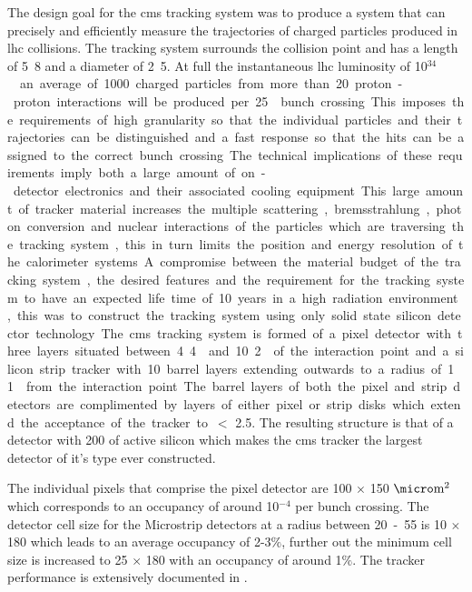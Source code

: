 The design goal for the \ac{cms} tracking system was to produce a system that 
can precisely and efficiently measure the trajectories of charged particles 
produced in \ac{lhc} collisions. The tracking system surrounds the collision 
point and has a length of \unit{5.8}{\meter} and a diameter of 
\unit{2.5}{\meter}. At full the instantaneous \ac{lhc} luminosity of 
\unit{10$^{34}$}{\lumiunits} an average of 1000 charged particles from more 
than 20 proton-proton interactions will be produced per \unit{25}{\nano\second} 
bunch crossing. This imposes the requirements of high granularity so that the 
individual particles and their trajectories can be distinguished and a fast 
response so that the hits can be assigned to the correct bunch crossing. The 
technical implications of these requirements imply both a large amount of 
on-detector electronics and their associated cooling equipment. This large 
amount of tracker material increases the multiple scattering, bremsstrahlung, 
photon conversion and nuclear interactions of the particles which are 
traversing the tracking system, this in turn limits the position and energy 
resolution of the calorimeter systems. A compromise between the material budget 
of the tracking system, the desired features and the requirement for the 
tracking system to have an expected life time of 10 years in a high radiation 
environment, this was to construct the tracking system using only solid state 
silicon detector technology.

The \ac{cms} tracking system is formed of a pixel detector with three layers 
situated between \unit{4.4}{\cm} and \unit{10.2}{\cm} of the interaction point 
and a silicon strip tracker with 10 barrel layers extending outwards to a 
radius of \unit{1.1}{\meter} from the interaction point. The barrel layers of 
both the pixel and strip detectors are complimented by layers of either pixel 
or strip disks which extend the acceptance of the tracker to \mETA $<$ 2.5. The 
resulting structure is that of a detector with \unit{200}{\squaremetre} of 
active silicon which makes the \ac{cms} tracker the largest detector of it's 
type ever constructed.

The individual pixels that comprise the pixel detector are 100 $\times$ 
150 $\micro\textrm{m}^{2}$ which corresponds to an occupancy of around 
10$^{-4}$ per bunch crossing. The detector cell size for the Microstrip 
detectors at a radius between \unit{20-55}{\cm} is \unit{10}{\cm} $\times$ 
\unit{180}{\micro\meter} which leads to an average occupancy of 2-3$\%$, 
further out the minimum cell size is increased to \unit{25}{\cm} $\times$ 
\unit{180}{\micro\meter} with an occupancy of around 1$\%$. The tracker 
performance is extensively documented in \cite{cmstracking}.

